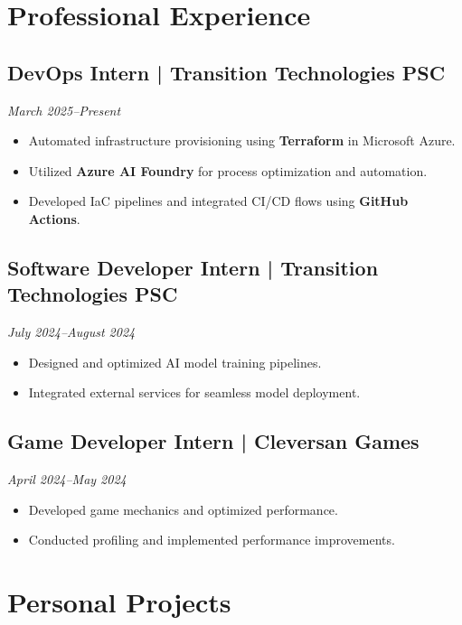 \documentclass[a4paper,10pt]{article}
\begin{document}
\section{Professional Experience}

\subsection{DevOps Intern | Transition Technologies PSC}
\textit{March 2025--Present}
\begin{itemize}[leftmargin=0.5cm, nosep]
    \item Automated infrastructure provisioning using \textbf{Terraform} in Microsoft Azure.
    \item Utilized \textbf{Azure AI Foundry} for process optimization and automation.
    \item Developed IaC pipelines and integrated CI/CD flows using \textbf{GitHub Actions}.
\end{itemize}

\subsection{Software Developer Intern | Transition Technologies PSC}
\textit{July 2024--August 2024}
\begin{itemize}[leftmargin=0.5cm, nosep]
    \item Designed and optimized AI model training pipelines.
    \item Integrated external services for seamless model deployment.
\end{itemize}

\subsection{Game Developer Intern | Cleversan Games}
\textit{April 2024--May 2024}
\begin{itemize}[leftmargin=0.5cm, nosep]
    \item Developed game mechanics and optimized performance.
    \item Conducted profiling and implemented performance improvements.
\end{itemize}

\section{Personal Projects}
\end{document}
